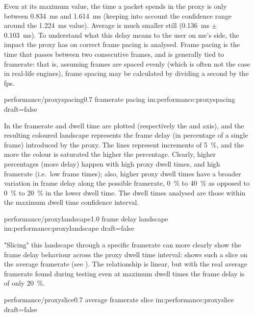 Even at its maximum value, the time a packet spends in the proxy is only between \SI{0,834}{\milli\second} and \SI{1,614}{\milli\second} (keeping into account the confidence range around the \SI{1,224}{\milli\second} value). Average is much smaller still (\SI{0,136}{\milli\second} $\pm$ \SI{0,103}{\milli\second}). To understand what this delay means to the user on \gls{me}'s side, the impact the proxy has on correct frame pacing is analysed. Frame pacing is the time that passes between two consecutive frames, and is generally tied to \gls{framerate}: that is, assuming frames are spaced evenly (which is often not the case in real-life engines), frame spacing may be calculated by dividing a second by the \gls{fps}.

\begin{image}
	{performance/proxyspacing}{0.7}
	{\gls{framerate} pacing}
	{im:performance:proxyspacing}
	{draft=false}
\end{image}

In  the \gls{framerate} and dwell time are plotted (respectively the  and  axis), and the resulting coloured landscape represents the frame delay (in percentage of a single frame) introduced by the proxy. The lines represent increments of \SI{5}{\percent}, and the more the colour is saturated the higher the percentage. Clearly, higher percentages (more delay) happen with high proxy dwell times, and high \gls{framerate} (i.e.\ low frame times); also, higher proxy dwell times have a broader variation in frame delay along the possible \gls{framerate}, \SI{0}{\percent} to \SI{40}{\percent} as opposed to \SI{0}{\percent} to \SI{20}{\percent} in the lower dwell time. The dwell times analysed are those within the maximum dwell time confidence interval.

\begin{image}
	{performance/proxylandscape}{1.0}
	{frame delay landscape}
	{im:performance:proxylandscape}
	{draft=false}
\end{image}

"Slicing" this landscape through a specific \gls{framerate} can more clearly show the frame delay behaviour across the proxy dwell time interval:  shows such a slice on the average \gls{framerate} (see ). The relationship is linear, but with the real average framerate found during testing even at maximum dwell times the frame delay is of only \SI{20}{\percent}.

\begin{image}
	{performance/proxyslice}{0.7}
	{average \gls{framerate} slice}
	{im:performance:proxyslice}
	{draft=false}
\end{image}

